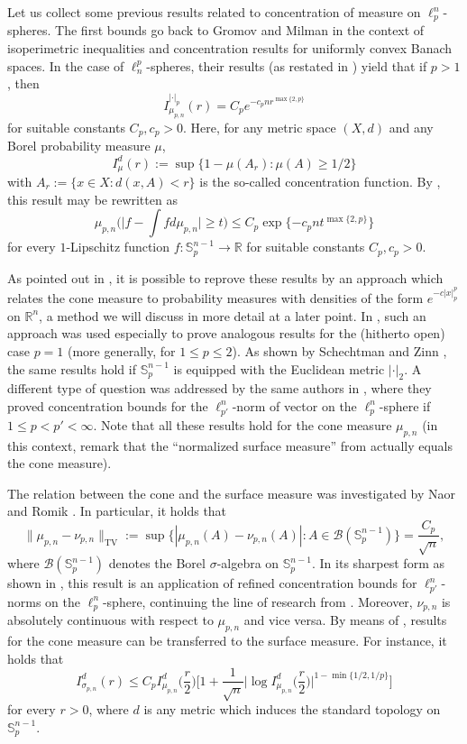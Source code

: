 \documentclass[a4paper,12pt]{amsart}
\numberwithin{equation}{section}
\theoremstyle{remark}
\def\R{{\mathbb R}}
\def\S{{\mathbb S}}
\begin{document}
Let us collect some previous results related to concentration of measure on $\ell_p^n$-spheres. The first bounds go back to Gromov and Milman \cite{GM87} in the context of isoperimetric inequalities and concentration results for uniformly convex Banach spaces. In the case of $\ell_n^p$-spheres, their results (as restated in \cite[Th.\ 2.16]{Led01}) yield that if $p > 1$, then
\[
I_{\mu_{p,n}}^{|\cdot|_p}(r) = C_pe^{-c_pnr^{\max\{2,p\}}}
\]
for suitable constants $C_p,c_p>0$. Here, for any metric space $(X,d)$ and any Borel probability measure $\mu$,
\[
I_\mu^d(r) := \sup\{1-\mu(A_r) \colon \mu(A) \ge 1/2\}
\]
with $A_r := \{x \in X \colon d(x,A)<r\}$ is the so-called concentration function. By \cite[Prop.\ 1.7\&1.8]{Led01}, this result may be rewritten as
\begin{equation}\label{Lipschitz1}
    \mu_{p,n}\Big(\Big|f - \int f d\mu_{p,n}\Big| \ge t\Big) \le C_p \exp\{ - c_p n t^{\max\{2,p\}}\}
\end{equation}
for every $1$-Lipschitz function $f \colon \S_p^{n-1} \to \R$ for suitable constants $C_p,c_p>0$.

As pointed out in \cite{Led01}, it is possible to reprove these results by an approach which relates the cone measure to probability measures with densities of the form $e^{-c|x|_p^p}$ on $\R^n$, a method we will discuss in more detail at a later point. In \cite{AV00}, such an approach was used especially to prove analogous results for the (hitherto open) case $p=1$ (more generally, for $1 \le p \le 2$). As shown by Schechtman and Zinn \cite{SZ00}, the same results hold if $\S_p^{n-1}$ is equipped with the Euclidean metric $|\cdot|_2$. A different type of question was addressed by the same authors in \cite{SZ90}, where they proved concentration bounds for the $\ell_{p'}^n$-norm of vector on the $\ell_p^n$-sphere if $1 \le p < p' < \infty$. Note that all these results hold for the cone measure $\mu_{p,n}$ (in this context, remark that the ``normalized surface measure'' from \cite[Eq.\ (2.26)]{Led01} actually equals the cone measure).

The relation between the cone and the surface measure was investigated by Naor and Romik \cite{NR03,Nao07}. In particular, it holds that
\[
\lVert \mu_{p,n} - \nu_{p,n} \rVert_\mathrm{TV} := \sup\big\{ |\mu_{p,n}(A) - \nu_{p,n}(A)| \colon A \in \mathcal{B}(\S_p^{n-1})\big\} = \frac{C_p}{\sqrt{n}},
\]
where $\mathcal{B}(\S_p^{n-1})$ denotes the Borel $\sigma$-algebra on $\S_p^{n-1}$. In its sharpest form as shown in \cite{Nao07}, this result is an application of refined concentration bounds for $\ell_{p'}^n$-norms on the $\ell_p^n$-sphere, continuing the line of research from \cite{SZ90}. Moreover, $\nu_{p,n}$ is absolutely continuous with respect to $\mu_{p,n}$ and vice versa. By means of \cite{Nao07}, results for the cone measure can be transferred to the surface measure. For instance, it holds that
\begin{equation}\label{CSN}
    I_{\sigma_{p,n}}^d(r) \le C_p I_{\mu_{p,n}}^d\Big(\frac{r}{2}\Big)\Big[1 + \frac{1}{\sqrt{n}}\Big|\log I_{\mu_{p,n}}^d\Big(\frac{r}{2}\Big)\Big|^{1-\min\{1/2,1/p\}}\Big]
\end{equation}
for every $r > 0$, where $d$ is any metric which induces the standard topology on $\S_p^{n-1}$.
\end{document}
